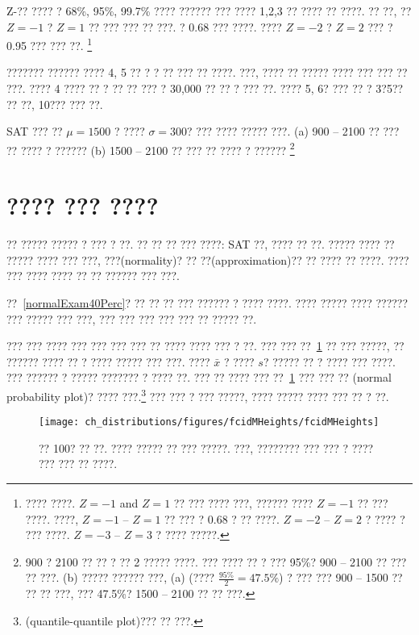 \begin{exercise}
Z-?? ???? ? 68\%, 95\%, 99.7\% ???? ?????? ??? ???? 1,2,3 ?? ???? ?? ????. ?? ??, ?? $Z=-1$ ? $Z=1$ ?? ??? ??? ?? ???. ? 0.68 ??? ????. ???? $Z=-2$ ? $Z=2$ ??? ? 0.95 ??? ??? ??.
\footnote{
???? ????. $Z=-1$ and $Z=1$ ?? ??? ???? ???, ?????? ???? $Z=-1$ ?? ??? ????. ????, $Z=-1$ -- $Z=1$ ?? ??? ? 0.68 ? ?? ????. $Z=-2$ -- $Z=2$ ? ???? ? ??? ????. $Z=-3$ -- $Z=3$ ? ???? ?????.}
\end{exercise}

??????? ?????? ???? 4, 5 ?? ? ? ?? ??? ?? ????. ???, ???? ?? ????? ???? ??? ??? ?? ???. ???? 4 ???? ?? ? ?? ?? ??? ? 30,000 ?? ?? ? ??? ??. ???? 5, 6? ??? ?? ? 3?5?? ?? ??, 10??? ??? ??.

\begin{exercise}
SAT ??? ?? $\mu = 1500$ ? ????  $\sigma = 300$? ??? ???? ????? ???. (a) 900 -- 2100 ?? ??? ?? ???? ? ?????? (b) 1500 -- 2100 ?? ??? ?? ???? ? ??????
\footnote{900 ? 2100 ?? ?? ? ?? 2 ????? ????. ??? ???? ?? ? ??? 95\%? 900 -- 2100 ?? ??? ?? ???. (b) ????? ?????? ???, (a) (???? $\frac{95\%}{2} = 47.5\%$) ? ??? ??? 900 -- 1500 ?? ?? ?? ???, 
??? 47.5\%? 1500 -- 2100 ?? ?? ???.}
\end{exercise}

\section{???? ??? ????}
\label{assessingNormal}

?? ????? ????? ? ??? ? ??. ?? ?? ?? ??? ????: SAT ??, ???? ?? ??. ????? ???? ?? ????? ???? ??? ???, ???(normality)? ?? ??(approximation)?? ?? ???? ?? ????. ???? ??? ???? ???? ?? ?? ?????? ??? ???.


??~\ref{normalExam40Perc}? ?? ?? ?? ??? ?????? ? ???? ????. ???? ????? ???? ?????? ??? ????? ??? ???, ??? ??? ??? ??? ??? ?? ????? ??.

??? ??? ???? ??? ??? ??? ??? ?? ???? ???? ??? ? ??. ??? ??? ??~\ref{fcidMHeights} ?? ??? ?????, ?? ?????? ???? ?? ? ???? ????? ??? ???. ???? $\bar{x}$ ? ???? $s$? ????? ?? ? ???? ??? ????. ??? ?????? ? ????? ??????? ? ???? ??. ??? ?? ???? ??? ??~\ref{fcidMHeights} ??? ??? ?? (normal probability plot)? ???? ???.\footnote{(quantile-quantile plot)??? ?? ???.} ??? ??? ? ??? ?????, ???? ????? ???? ??? ?? ? ??.

\begin{figure}
\centering
\texttt{[image: ch\_distributions/figures/fcidMHeights/fcidMHeights]}
\caption{?? 100? ?? ??. ???? ????? ?? ??? ?????. ???, ???????? ??? ??? ? ???? ??? ??? ?? ????.}
\label{fcidMHeights}
\end{figure}

